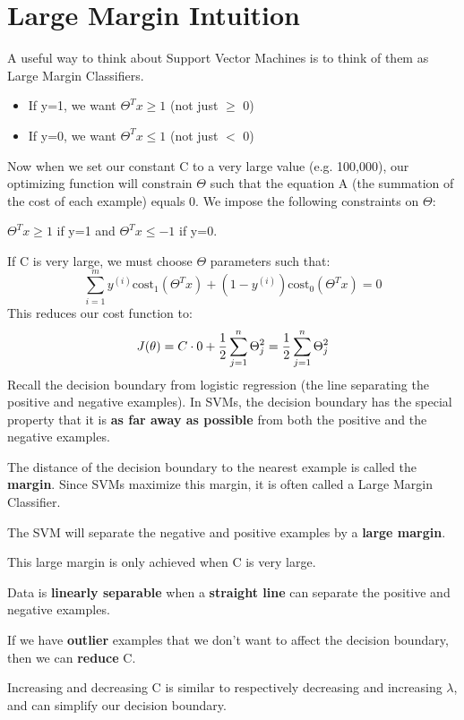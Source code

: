\section{Large Margin Intuition}
A useful way to think about Support Vector Machines is to think of them as Large Margin Classifiers.
\begin{itemize}
\item If y=1, we want $\Theta^Tx \geq 1$ (not just $\ge$ 0)
\item If y=0, we want $\Theta^Tx \leq 1$ (not just $<$ 0)
\end{itemize}

Now when we set our constant C to a very large value (e.g. 100,000), our optimizing function will constrain $\Theta$ such that the equation A (the summation of the cost of each example) equals 0. We impose the following constraints on $\Theta$:

$\Theta^Tx \geq 1$ if y=1 and $\Theta^Tx \leq -1$ if y=0.

If C is very large, we must choose $\Theta$ parameters such that:
\[\sum_{i=1}^m y^{(i)}\text{cost}_1(\Theta^Tx) + (1 - y^{(i)})\text{cost}_0(\Theta^Tx) = 0\]
This reduces our cost function to:
\begin{align*}
J(\theta) = C \cdot 0 + \dfrac{1}{2}\sum_{j=1}^n \Theta^2_j \newline
= \dfrac{1}{2}\sum_{j=1}^n \Theta^2_j
\end{align*}
Recall the decision boundary from logistic regression (the line separating the positive and negative examples). In SVMs, the decision boundary has the special property that it is \textbf{as far away as possible} from both the positive and the negative examples.

The distance of the decision boundary to the nearest example is called the \textbf{margin}. Since SVMs maximize this margin, it is often called a Large Margin Classifier.

The SVM will separate the negative and positive examples by a \textbf{large margin}.

This large margin is only achieved when C is very large.

Data is \textbf{linearly separable} when a \textbf{straight line} can separate the positive and negative examples.

If we have \textbf{outlier} examples that we don't want to affect the decision boundary, then we can \textbf{reduce} C.

Increasing and decreasing C is similar to respectively decreasing and increasing $\lambda$, and can simplify our decision boundary.
